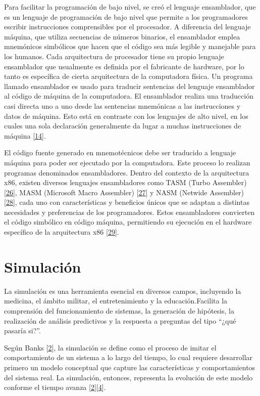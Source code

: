 \documentclass[12pt,twoside]{templates/unerthesis}
\begin{document}
Para facilitar la programación de bajo nivel, se creó el lenguaje ensamblador, que es un lenguaje de programación de bajo nivel que permite a los programadores escribir instrucciones comprensibles por el procesador. A diferencia del lenguaje máquina, que utiliza secuencias de números binarios, el ensamblador emplea mnemónicos simbólicos que hacen que el código sea más legible y manejable para los humanos. Cada arquitectura de procesador tiene su propio lenguaje ensamblador que usualmente es definida por el fabricante de hardware, por lo tanto es específica de cierta arquitectura de la computadora física. Un programa llamado ensamblador es usado para traducir sentencias del lenguaje ensamblador al código de máquina de la computadora. El ensamblador realiza una traducción casi directa uno a uno desde las sentencias mnemónicas a las instrucciones y datos de máquina. Esto está en contraste con los lenguajes de alto nivel, en los cuales una sola declaración generalmente da lugar a muchas instrucciones de máquina {[}\protect\hyperlink{ref-stallings_computer_2013}{14}{]}.

El código fuente generado en mnemotécnicos debe ser traducido a lenguaje máquina para poder ser ejecutado por la computadora. Este proceso lo realizan programas denominados ensambladores. Dentro del contexto de la arquitectura x86, existen diversos lenguajes ensambladores como TASM (Turbo Assembler) {[}\protect\hyperlink{ref-tasm}{26}{]}, MASM (Microsoft Macro Assembler) {[}\protect\hyperlink{ref-masm}{27}{]} y NASM (Netwide Assembler) {[}\protect\hyperlink{ref-nasm}{28}{]}, cada uno con características y beneficios únicos que se adaptan a distintas necesidades y preferencias de los programadores. Estos ensambladores convierten el código simbólico en código máquina, permitiendo su ejecución en el hardware específico de la arquitectura x86 {[}\protect\hyperlink{ref-hyde2010art}{29}{]}.

\hypertarget{simulaciuxf3n}{%
\section{Simulación}\label{simulaciuxf3n}}

La simulación es una herramienta esencial en diversos campos, incluyendo la medicina, el ámbito militar, el entretenimiento y la educación.Facilita la comprensión del funcionamiento de sistemas, la generación de hipótesis, la realización de análisis predictivos y la respuesta a preguntas del tipo ``¿qué pasaría si?''.

Según Banks {[}\protect\hyperlink{ref-banks_discrete-event_2010}{2}{]}, la simulación se define como el proceso de imitar el comportamiento de un sistema a lo largo del tiempo, lo cual requiere desarrollar primero un modelo conceptual que capture las características y comportamientos del sistema real. La simulación, entonces, representa la evolución de este modelo conforme el tiempo avanza {[}\protect\hyperlink{ref-banks_discrete-event_2010}{2}{]}{[}\protect\hyperlink{ref-robinson_simulation_2014}{4}{]}.
\end{document}
